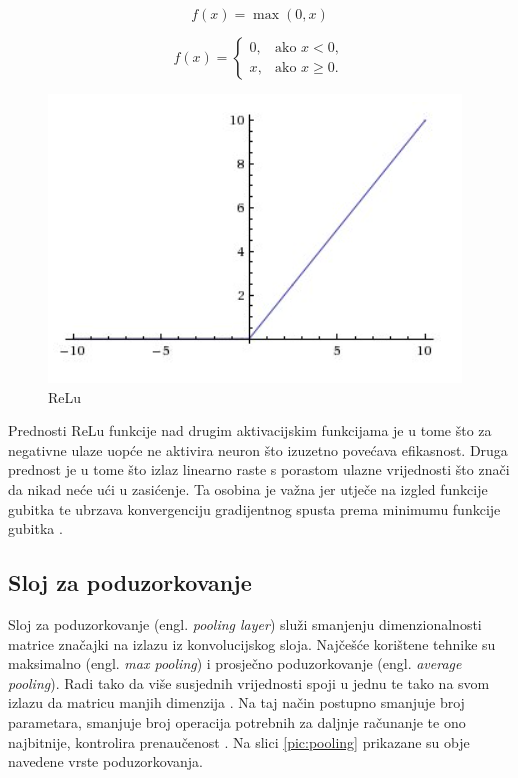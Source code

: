\begin{equation}
    f(x) = \max(0, x)
    \label{eq:relu1}
\end{equation}

\begin{equation}
    f(x) = 
    \begin{cases} 
        0, & \text{ako } x < 0, \\
        x, & \text{ako } x \geq 0.
    \end{cases}
    \label{eq:relu2}
\end{equation}

\begin{figure}[htb]
    \centering
    \includegraphics[width=0.5\linewidth]{Chapters/neuronska_mreza/CNN/relu.png} 
    \caption{ReLu \cite{relu}}
    \label{pic:relu}
\end{figure}

Prednosti ReLu funkcije nad drugim aktivacijskim funkcijama je u tome što za negativne
ulaze uopće ne aktivira neuron što izuzetno povećava efikasnost. Druga prednost je u tome
što izlaz linearno raste s porastom ulazne vrijednosti što znači da nikad neće ući
u zasićenje. Ta osobina je važna jer utječe na izgled funkcije gubitka te ubrzava
konvergenciju gradijentnog spusta prema minimumu funkcije gubitka \cite{activation_fcn}.


\subsection{Sloj za poduzorkovanje}
\label{sub:pooling}
Sloj za poduzorkovanje (engl. \textit{pooling layer}) služi smanjenju dimenzionalnosti matrice
značajki na izlazu iz konvolucijskog sloja. Najčešće korištene tehnike su maksimalno 
(engl. \textit{max pooling}) i prosječno poduzorkovanje (engl. \textit{average pooling}). 
Radi tako da više 
susjednih vrijednosti spoji u jednu te tako na svom izlazu da matricu manjih dimenzija 
\cite{pooling1}. Na taj način postupno smanjuje broj parametara, smanjuje broj
operacija potrebnih za daljnje računanje te ono najbitnije, kontrolira
prenaučenost \cite{cnn_whatis}. Na slici \ref{pic:pooling} prikazane su obje navedene vrste poduzorkovanja.

